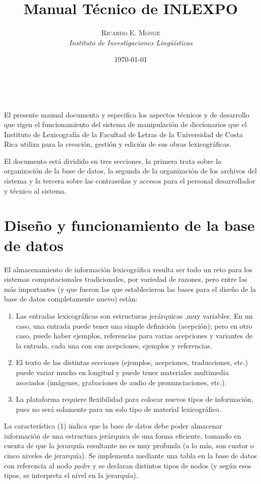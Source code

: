 \documentclass[11pt]{article} %
\title{\textbf{Manual Técnico de INLEXPO}} %
\author{\textsc{Ricardo E. Monge} %
\\{\textit{Instituto de Investigaciones Lingüísticas}}} %
\date{\today} %
\makeatletter
\renewcommand{\maketitle}{ %
\begin{flushright} %
{\LARGE\@title} %

\vspace{50pt} %

{\large\@author} %
\\\@date %

\vspace{40pt} %
\end{flushright}
}
\makeatother
\begin{document}
\maketitle 
El presente manual documenta y especifica los aspectos técnicos y de desarrollo que rigen el funcionamiento del sistema de manipulación de diccionarios que el Instituto de Lexicografía de la Facultad de Letras de la Universidad de Costa Rica utiliza para la creación, gestión y edición de sus obras lexicográficas.

El documento está dividido en tres secciones, la primera trata sobre la organización de la base de datos, la segunda de la organización de los archivos del sistema y la tercera sobre las contraseñas y accesos para el personal desarrollador y técnico al sistema. %

\section*{Diseño y funcionamiento de la base de datos}
El almacenamiento de información lexicográfica resulta ser todo un reto para los sistemas computacionales tradicionales, por  variedad de razones, pero entre las más importantes (y que fueron las que establecieron las bases para el diseño de la base de datos completamente nuevo) estàn:

\begin{enumerate}
\item Las entradas lexicográficas son estructuras jerárquicas ,muy variables. En un caso, una entrada puede tener una simple definición (acepción); pero en otro caso, puede haber ejemplos, referencias para varias acepciones y variantes de la entrada, cada una con sus acepciones, ejemplos y referencias. 
\item El texto de las distintas secciones (ejemplos, acepciones, traducciones, etc.) puede variar mucho en longitud y puede tener materiales multimedia asociados (imágenes, grabaciones de audio de pronunciaciones, etc.).
\item La plataforma requiere flexibilidad para colocar nuevos tipos de información, pues no será solamente para un solo tipo de material lexicográfico.
\end{enumerate}

La característica (1) indica que la base de datos debe poder almacenar información de una estructura jerárquica de una forma eficiente, tomando en cuenta de que la jerarquía resultante no es muy profunda (a lo más, son cuator o cinco niveles de jerarquía). Se implementa mediante una tabla en la base de datos con referencia al nodo \textit{padre} y se declaran distintos tipos de nodos (y según esos tipos, se interpreta el nivel en la jerarquía).
\end{document}
